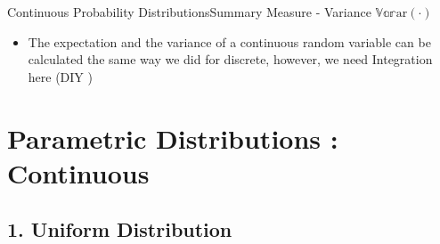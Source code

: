 \documentclass[8pt, usepdftitle = false]{beamer}
\begin{document}
\begin{frame}[allowframebreaks]{Continuous Probability Distributions}{Summary Measure - Variance $\mathbb{Var}\mathrm{ar}(\cdot)$}
\begin{itemize}







\item The expectation and the variance of a continuous random variable can be calculated the same way we did for discrete, however, we need \alert{Integration} here (DIY \faEdit \faEdit \faEdit)



\end{itemize} 


\end{frame}


\section{Parametric Distributions : Continuous}
\frame{\sectionpage}

\subsection{1. Uniform Distribution}
\frame{\subsectionpage}
\end{document}
